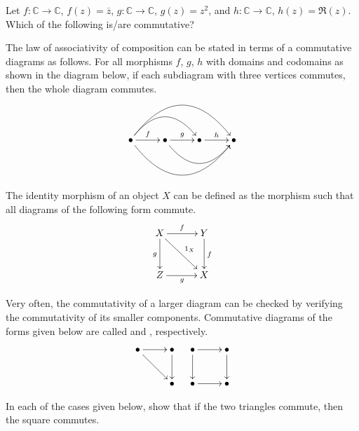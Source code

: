 \begin{Exercise}
Let $f \colon \mathbb C \to \mathbb C$, $f(z) = \overline z$, $g \colon \mathbb C \to \mathbb C$, $g(z) = z^2$, and $h \colon \mathbb C \to \mathbb C$, $h(z) = \Re(z)$. Which of the following is/are commutative?
\begin{figure}[H]
\centering
{} \qquad
{}
\end{figure}
\end{Exercise}

\begin{Example}
The law of associativity of composition can be stated in terms of a commutative diagrams as follows. For all morphisms $f$, $g$, $h$ with domains and codomains as shown in the diagram below, if each subdiagram with three vertices commutes, then the whole diagram commutes.
\begin{equation*}
\xymatrix{
\bullet \ar[r]^f \ar@/^2pc/[rr] \ar@/^3pc/[rrr]^{} \ar@/_3pc/[rrr]_{}
& \bullet \ar[r]^g \ar@/_2pc/[rr]
& \bullet \ar[r]^h & \bullet
}
\end{equation*}

The identity morphism of an object $X$ can be defined as the morphism such that all diagrams of the following form commute.
\begin{equation*}
\xymatrix@=3em{
X \ar[r]^f \ar[rd]^{1_X} \ar[d]_g & Y \ar[d]^f \\
Z \ar[r]_g & X
}
\end{equation*}
\end{Example}

Very often, the commutativity of a larger diagram can be checked by verifying the commutativity of its smaller components. Commutative diagrams of the forms given below are called  and , respectively.
\begin{align*}
\xymatrix{
\bullet \ar[r] \ar[rd] & \bullet \ar[d]\\
& \bullet
}
&&
\xymatrix{
\bullet \ar[r] \ar[d] & \bullet \ar[d] \\
\bullet \ar[r] & \bullet
}
\end{align*}

\begin{Exercise}
In each of the cases given below, show that if the two triangles commute, then the square commutes.
\begin{figure}[H]
\centering
\subcaptionbox{\label{subfig:CommSq1}}{
$\xymatrix@=3em{
\bullet \ar[r] \ar[d] \ar[rd] & \bullet \ar[d] \\
\bullet \ar[r] & \bullet
}$
}
\hspace{0.3\textwidth}
\subcaptionbox{\label{subfig:CommSq2}}{
$\xymatrix@=3em{
\bullet \ar[r] \ar[d] & \bullet \ar[d] \ar[ld]\\
\bullet \ar[r] & \bullet
}$
}
\end{figure}
\end{Exercise}

